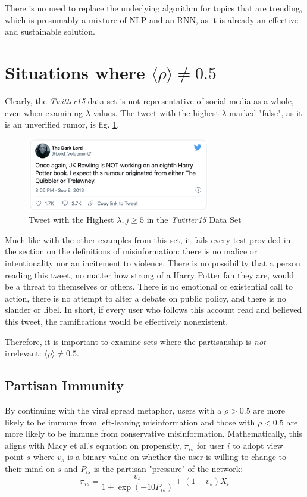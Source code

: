 \documentclass[preprint,review,12pt]{elsarticle}
\begin{document}
There is no need to replace the underlying algorithm for topics that are trending, which is presumably a mixture of NLP and an RNN, as it is already an effective and sustainable solution. 



\section{Situations where $\langle \rho \rangle \neq 0.5$} 
Clearly, the \textit{Twitter15} data set is not representative of social media as a whole, even when examining $\lambda$ values. The tweet with the highest $\lambda$ marked "false", as it is an unverified rumor, is fig. \ref{img:Voldemort Tweet}. 
\begin{figure}[htp]
    \centering
    \includegraphics[width=8cm]{voldemort tweet.png}
    \caption{Tweet with the Highest $\lambda, j \geq 5$ in the \textit{Twitter15} Data Set}
    \label{img:Voldemort Tweet}
\end{figure} Much like with the other examples from this set, it fails every test provided in the section on the definitions of misinformation: there is no malice or intentionality nor an incitement to violence. There is no possibility that a person reading this tweet, no matter how strong of a Harry Potter fan they are, would be a threat to themselves or others. There is no emotional or existential call to action, there is no attempt to alter a debate on public policy, and there is no slander or libel. In short, if every user who follows this account read and believed this tweet, the ramifications would be effectively nonexistent. 

Therefore, it is important to examine sets where the partisanship is \textit{not} irrelevant: $\langle \rho \rangle  \neq 0.5$. 

\subsection{Partisan Immunity}
By continuing with the viral spread metaphor, users with a $\rho > 0.5$ are more likely to be immune from left-leaning misinformation and those with  $\rho < 0.5$ are more likely to be immune from conservative misinformation. Mathematically, this aligns with Macy et al.'s equation on propensity, $\pi_{is}$ for user $i$ to adopt view point $s$ where $v_s$ is a binary value on whether the user is willing to change to their mind on $s$ and $P_{is}$ is the partisan "pressure" of the network:
\begin{equation}
\label{propensity}
    \pi_{is}=\frac{v_s}{1+\exp{(-10P_{is})}}+(1-v_{s})X_i
\end{equation}
\end{document}
